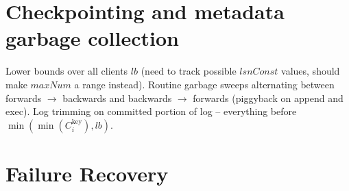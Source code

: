 \documentclass{article}
\begin{document}


\section{Checkpointing and metadata garbage collection}
Lower bounds over all clients $lb$ (need to track possible $lsnConst$ values, should make $maxNum$ a range instead). Routine garbage sweeps alternating between forwards $\rightarrow$ backwards and backwards $\rightarrow$ forwards (piggyback on append and exec). Log trimming on committed portion of log -- everything before $\min(\min(C_i^{\text{key}}), lb)$.
\section{Failure Recovery}

\end{document}
